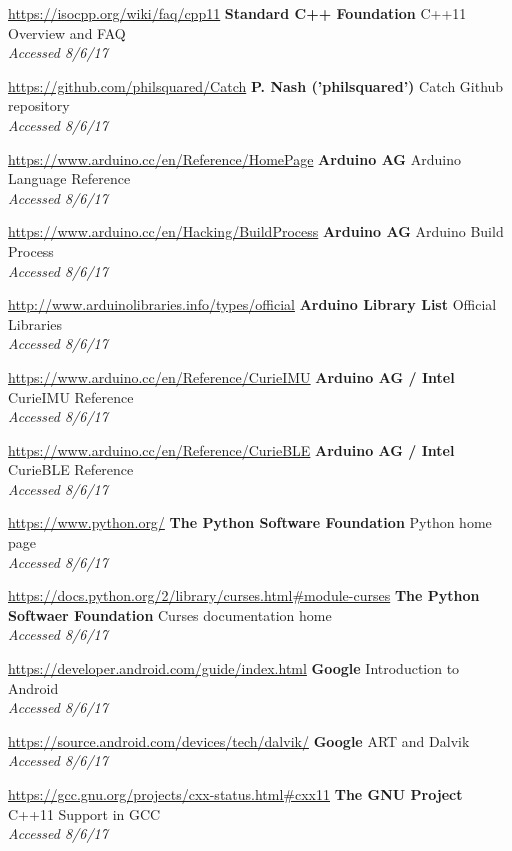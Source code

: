 \documentclass[a4paper]{article}
\begin{document}
\begin{thebibliography}{9}
\url{https://isocpp.org/wiki/faq/cpp11}
\textbf{Standard C++ Foundation}
C++11 Overview and FAQ
\\\textit{Accessed 8/6/17}

\url{https://github.com/philsquared/Catch}
\textbf{P. Nash ('philsquared')}
Catch Github repository
\\\textit{Accessed 8/6/17}

\url{https://www.arduino.cc/en/Reference/HomePage}
\textbf{Arduino AG}
Arduino Language Reference
\\\textit{Accessed 8/6/17}

\url{https://www.arduino.cc/en/Hacking/BuildProcess}
\textbf{Arduino AG}
Arduino Build Process
\\\textit{Accessed 8/6/17}

\url{http://www.arduinolibraries.info/types/official}
\textbf{Arduino Library List}
Official Libraries
\\\textit{Accessed 8/6/17}

\url{https://www.arduino.cc/en/Reference/CurieIMU}
\textbf{Arduino AG / Intel}
CurieIMU Reference
\\\textit{Accessed 8/6/17}

\url{https://www.arduino.cc/en/Reference/CurieBLE}
\textbf{Arduino AG / Intel}
CurieBLE Reference
\\\textit{Accessed 8/6/17}

\url{https://www.python.org/}
\textbf{The Python Software Foundation}
Python home page
\\\textit{Accessed 8/6/17}

\url{https://docs.python.org/2/library/curses.html#module-curses}
\textbf{The Python Softwaer Foundation}
Curses documentation home
\\\textit{Accessed 8/6/17}

\url{https://developer.android.com/guide/index.html}
\textbf{Google}
Introduction to Android
\\\textit{Accessed 8/6/17}

\url{https://source.android.com/devices/tech/dalvik/}
\textbf{Google}
ART and Dalvik
\\\textit{Accessed 8/6/17}

\url{https://gcc.gnu.org/projects/cxx-status.html#cxx11}
\textbf{The GNU Project}
C++11 Support in GCC
\\\textit{Accessed 8/6/17}


\end{thebibliography}
\end{document}
